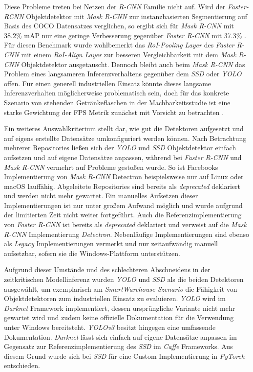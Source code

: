 Diese Probleme treten bei Netzen der \textit{R-CNN} Familie nicht auf. Wird der \textit{Faster-RCNN} Objektdetektor mit \textit{Mask R-CNN} zur instanzbasierten Segmentierung auf Basis des COCO Datensatzes verglichen, so ergibt sich für \textit{Mask R-CNN} mit 38.2\% mAP nur eine geringe Verbesserung gegenüber \textit{Faster R-CNN} mit 37.3\% \cite{KaimingHeGeorgiaGkioxariPiotrDollarRossGirshick.20180224}. Für diesen Benchmark wurde wohlbemerkt das \textit{RoI-Pooling Layer} des \textit{Faster R-CNN} mit einem \textit{RoI-Align Layer} zur besseren Vergleichbarkeit mit dem \textit{Mask R-CNN} Objektdetektor ausgetauscht. Dennoch bleibt auch beim \textit{Mask R-CNN} das Problem eines langsameren Inferenzverhaltens gegenüber dem \textit{SSD} oder \textit{YOLO} offen. Für einen generell industriellen Einsatz könnte dieses langsame Inferenzverhalten möglicherweise problematisch sein, doch für das konkrete Szenario von stehenden Getränkeflaschen in der Machbarkeitsstudie ist eine starke Gewichtung der FPS Metrik zunächst mit Vorsicht zu betrachten \cite{IntanPurnamasar.20181215}. 

Ein weiteres Auswahlkriterium stellt dar, wie gut die Detektoren aufgesetzt und auf eigens erstellte Datensätze umkonfiguriert werden können. Nach Betrachtung mehrerer Repositories ließen sich der \textit{YOLO} und \textit{SSD} Objektdetektor einfach aufsetzen und auf eigene Datensätze anpassen, während bei \textit{Faster R-CNN} und \textit{Mask R-CNN} vermehrt auf Probleme gestoßen wurde. So ist Facebooks Implementierung von \textit{Mask R-CNN} \glqq Detectron\grqq{} beispielsweise nur auf Linux oder macOS lauffähig. Abgeleitete Repositories sind bereits als \textit{deprecated} deklariert und werden nicht mehr gewartet. Ein manuelles Aufsetzen dieser Implementierungen ist nur unter großem Aufwand möglich und wurde aufgrund der limitierten Zeit nicht weiter fortgeführt. Auch die Referenzimplementierung von \textit{Faster R-CNN} ist bereits als \textit{deprecated} deklariert und verweist auf die \textit{Mask R-CNN} Implementierung \textit{Detectron}. Nebenläufige Implementierungen sind ebenso als \textit{Legacy} Implementierungen vermerkt und nur zeitaufwändig manuell aufsetzbar, sofern sie die Windows-Plattform unterstützen.

Aufgrund dieser Umstände und des schlechteren Abschneidens in der zeitkritischen Modellinferenz wurden \textit{YOLO} und \textit{SSD} als die beiden Detektoren ausgewählt, um exemplarisch am \textit{SmartWarehouse Szenario} die Fähigkeit von Objektdetektoren zum industriellen Einsatz zu evaluieren. \textit{YOLO} wird im \textit{Darknet} Framework implementiert, dessen ursprüngliche Variante nicht mehr gewartet wird und zudem keine offizielle Dokumentation für die Verwendung unter Windows bereitsteht. \textit{YOLOv3} besitzt hingegen eine umfassende Dokumentation. \textit{Darknet} lässt sich einfach auf eigene Datensätze anpassen im Gegensatz zur Referenzimplementierung des \textit{SSD} im \textit{Caffe} Frameworks. Aus diesem Grund wurde sich bei \textit{SSD} für eine Custom Implementierung in \textit{PyTorch} entschieden.